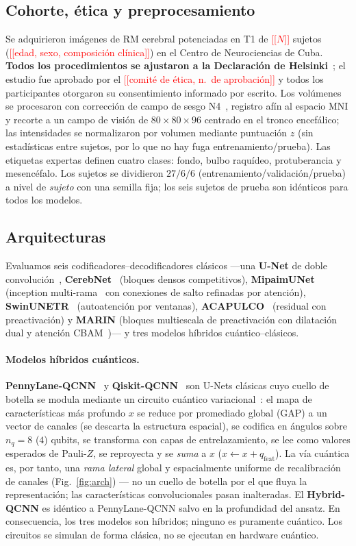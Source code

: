 \documentclass[runningheads]{llncs}
\newcommand{\todo}[1]{\textcolor{red}{[[#1]]}}
\begin{document}
\subsection{Cohorte, ética y preprocesamiento}
Se adquirieron imágenes de RM cerebral potenciadas en T1 de \todo{$N$} sujetos
(\todo{edad, sexo, composición clínica}) en el Centro de Neurociencias de Cuba.
\textbf{Todos los procedimientos se ajustaron a la Declaración de
Helsinki}~\cite{helsinki}; el estudio fue aprobado por el
\todo{comité de ética, n.\ de aprobación} y todos los participantes otorgaron
su consentimiento informado por escrito. Los volúmenes se procesaron con
corrección de campo de sesgo N4~\cite{n4}, registro afín al espacio MNI y
recorte a un campo de visión de $80\times80\times96$ centrado en el tronco
encefálico; las intensidades se normalizaron por volumen mediante puntuación
$z$ (sin estadísticas entre sujetos, por lo que no hay fuga
entrenamiento/prueba). Las etiquetas expertas definen cuatro clases: fondo,
bulbo raquídeo, protuberancia y mesencéfalo. Los sujetos se dividieron $27/6/6$
(entrenamiento/validación/prueba) a nivel de \emph{sujeto} con una semilla fija;
los seis sujetos de prueba son idénticos para todos los modelos.

\subsection{Arquitecturas}
Evaluamos seis codificadores--decodificadores clásicos ---una \textbf{U-Net} de
doble convolución~\cite{unet,unet3d}, \textbf{CerebNet}~\cite{cerebnet} (bloques
densos competitivos), \textbf{MipaimUNet} (inception multi-rama~\cite{inception}
con conexiones de salto refinadas por atención),
\textbf{SwinUNETR}~\cite{swinunetr,swin} (autoatención por ventanas),
\textbf{ACAPULCO}~\cite{acapulco} (residual con preactivación) y \textbf{MARIN}
(bloques multiescala de preactivación con dilatación dual y atención
CBAM~\cite{cbam})--- y tres modelos híbridos cuántico--clásicos.

\paragraph{Modelos híbridos cuánticos.} \textbf{PennyLane-QCNN}~\cite{pennylane}
y \textbf{Qiskit-QCNN}~\cite{qiskit} son U-Nets clásicas cuyo cuello de botella
se modula mediante un circuito cuántico variacional~\cite{qcnn}: el mapa de
características más profundo $x$ se reduce por promediado global (GAP) a un vector
de canales (se descarta la estructura espacial), se codifica en ángulos sobre
$n_q{=}8$ ($4$) qubits, se transforma con capas de entrelazamiento, se lee como
valores esperados de Pauli-$Z$, se reproyecta y se \emph{suma} a $x$
($x \leftarrow x + q_{\text{feat}}$). La vía cuántica es, por tanto, una
\emph{rama lateral} global y espacialmente uniforme de recalibración de canales
(Fig.~\ref{fig:arch}) --- no un cuello de botella por el que fluya la
representación; las características convolucionales pasan inalteradas. El
\textbf{Hybrid-QCNN} es idéntico a PennyLane-QCNN salvo en la profundidad del
ansatz. En consecuencia, los tres modelos son híbridos; ninguno es puramente
cuántico. Los circuitos se simulan de forma clásica, no se ejecutan en hardware
cuántico.
\end{document}
